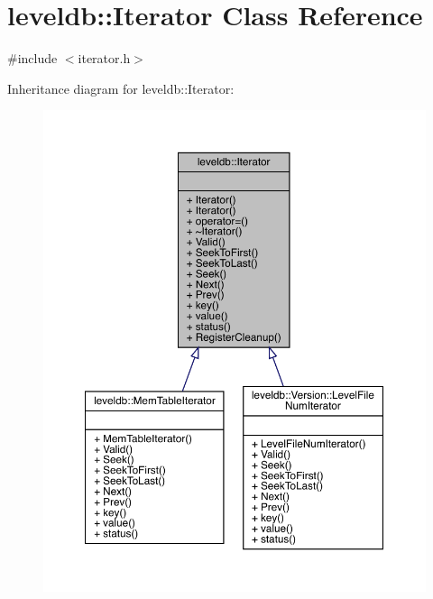 \hypertarget{classleveldb_1_1_iterator}{}\section{leveldb\+::Iterator Class Reference}
\label{classleveldb_1_1_iterator}


{\ttfamily \#include $<$iterator.\+h$>$}



Inheritance diagram for leveldb\+::Iterator\+:
\nopagebreak
\begin{figure}[H]
\begin{center}
\leavevmode
\includegraphics[width=350pt]{classleveldb_1_1_iterator__inherit__graph}
\end{center}
\end{figure}


